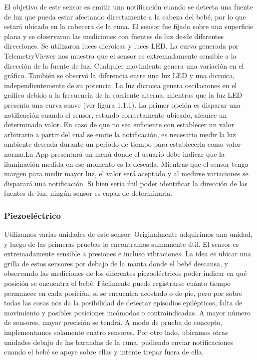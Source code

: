 \documentclass{IEEEtran}
\begin{document}
				El objetivo de este sensor es emitir una notificación cuando se detecta una fuente de luz que pueda estar afectando directamente a la cabeza del bebé, por lo que estará ubicado en la cabecera de la cuna.
				El sensor fue fijado sobre una superficie plana y se observaron las mediciones con fuentes de luz desde diferentes direcciones. Se utilizaron luces dicroicas y luces LED.
				La curva generada por TelemetryViewer nos muestra que el sensor es extremadamente sensible a la dirección de la fuente de luz. Cualquier movimiento genera una variación en el gráfico. También se observó la diferencia entre una luz LED y una dicroica, independientemente de su potencia. La luz dicroica genera oscilaciones en el gráfico debido a la frecuencia de la corriente alterna, mientras que la luz LED presenta una curva suave (ver figura 1.1.1).
				La primer opción es disparar una notificación cuando el sensor, estando correctamente ubicado, alcance un determinado valor.
				En caso de que no sea suficiente con establecer un valor arbitrario a partir del cual se emite la notificación, es necesario medir la luz ambiente deseada durante un periodo de tiempo para establecerla como valor norma.La App presentará un menú donde el usuario debe indicar que la iluminación medida en ese momento es la deseada. Mientras que el sensor tenga margen para medir mayor luz, el valor será aceptado y al medirse variaciones se disparará una notificación.
				Si bien sería útil poder identificar la dirección de las fuentes de luz, ningún sensor es capaz de determinarla.

			\subsubsection{Piezoeléctrico}

				Utilizamos varias unidades de este sensor. Originalmente adquirimos una unidad, y luego de las primeras pruebas lo encontramos sumamente útil. El sensor es extremadamente sensible a presiones e incluso vibraciones. La idea es ubicar una grilla de estos sensores por debajo de la manta donde el bebé descansa, y observando las mediciones de los diferentes piezoeléctricos poder indicar en qué posición se encuentra el bebé. Fácilmente puede registrarse cuánto tiempo permanece en cada posición, si se encuentra acostado o de pie, pero por sobre todas las cosas nos da la posibilidad de detectar episodios epilépticos, falta de movimiento y posibles posiciones incómodas o contraindicadas. A mayor número de sensores, mayor precisión se tendrá. A modo de prueba de concepto, implementamos solamente cuatro sensores.
				Por otro lado, ubicamos otras unidades debajo de las barandas de la cuna, pudiendo enviar notificaciones cuando el bebé se apoye sobre ellas y intente trepar fuera de ella.
\end{document}
